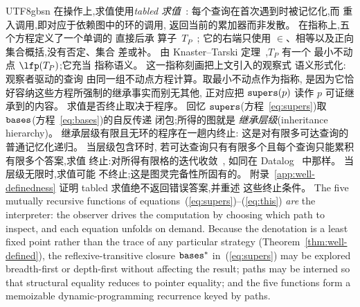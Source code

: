 \begin{CJK*}{UTF8}{gbsn}
在操作上,求值使用\emph{tabled
求值}~\cite{tamaki1986-tabled-resolution}:
每个查询在首次遇到时被记忆化,而
重入调用,即对应于依赖图中的环的调用,
返回当前的累加器而非发散。
在指称上,五个方程定义了一个单调的
直接后承
算子~$T_P$~\cite{vanemden1976-predicate-logic-semantics};
它的右端只使用 $\in$、相等以及正向集合概括,没有否定、集合
差或补。
由 Knaster--Tarski
定理~\cite{tarski1955-lattice-fixpoint-theorem},$T_P$ 有一个
最小不动点 $\lfp(T_P)$;它充当
指称语义。
这一指称刻画把上文引入的观察式
语义形式化:观察者驱动的查询
由同一组不动点方程计算。取最小不动点作为指称,
是因为它恰好容纳这些方程所强制的继承事实而别无其他,
正对应把 $\mathtt{supers}(p)$ 读作 $p$ 可证继承到的内容。
求值是否终止取决于程序。
回忆 $\mathtt{supers}$(方程~\ref{eq:supers})取
$\mathtt{bases}$(方程~\ref{eq:bases})的自反传递
闭包;所得的图就是
\emph{继承层级}(inheritance hierarchy)。
继承层级有限且无环的程序在一趟内终止:
这是对有限多可达查询的普通记忆化递归。
当层级包含环时,
若可达查询只有有限多个且每个查询只能累积有限多个答案,求值
终止:对所得有限格的迭代收敛~\cite{bancilhon1986-recursive-query-strategies},
如同在 Datalog~\cite{vanemden1976-predicate-logic-semantics} 中那样。
当层级无限时,求值可能
不终止;这是图灵完备性所固有的。
附录~\ref{app:well-definedness} 证明 tabled
求值绝不返回错误答案,并重述
这些终止条件。
\else
The five mutually recursive functions of equations~(\ref{eq:supers})--(\ref{eq:this}) \emph{are} the interpreter: the observer
drives the computation by choosing which path to
inspect, and each equation unfolds on demand.
Because the denotation is a least fixed point rather than the trace
of any particular strategy (Theorem~\ref{thm:well-defined}),
the reflexive-transitive closure $\mathtt{bases}^*$
in~(\ref{eq:supers}) may be explored breadth-first or
depth-first without affecting the result;
paths may be interned so that structural equality
reduces to pointer equality;
and the five functions form a memoizable
dynamic-programming recurrence keyed by paths.


\end{CJK*}

